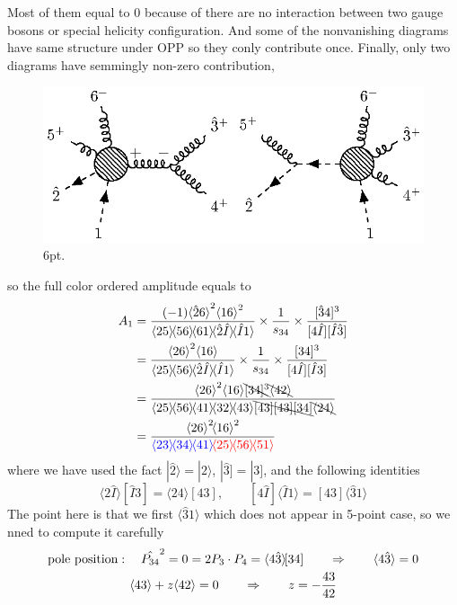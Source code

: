 \documentclass[12pt]{article}
\numberwithin{equation}{section}
\newcommand{\mdavg}[2]{\langle #1 \rangle\!\langle #2 \rangle}
\newcommand{\avg}[1]{\langle #1 \rangle}
\newcommand{\aket}[1]{|#1\rangle}
\newcommand{\asqu}[1]{{\langle#1\rangle}^2}
\newcommand{\sket}[1]{|#1]}
\newcommand{\cbrak}[2]{\avg{#1}\![#2]}
\newcommand{\acbrak}[2]{[#1]\!\avg{#2}}
\begin{document}
Most of them equal to 0 because of there are no interaction between two gauge bosons or special helicity configuration. And some of the nonvanishing diagrams have same structure under OPP so they conly contribute once. Finally, only two diagrams have semmingly non-zero contribution,
\par
\begin{figure}[H]
    \centering
    \includegraphics{6pt.eps}
    \caption{6pt.}
    \label{5}
\end{figure}
so the full color ordered amplitude equals to
\begin{align}
    A_1&=\frac{(-1)\asqu{\hat{2}6}\asqu{16}}{\mdavg{25}{56}\!\avg{61}\!\mdavg{\hat{2}\hat{I}}{\hat{I}1}}\times\frac{1}{s_{34}}\times\frac{[\hat{3}4]^3}{[4\hat{I}][\hat{I}\hat{3}]}\notag\\
    &=\frac{\asqu{26}\avg{16}}{\mdavg{25}{56}\!\mdavg{\hat{2}\hat{I}}{\hat{I}1}}\times\frac{1}{s_{34}}\times\frac{[34]^3}{[4\hat{I}][\hat{I}3]}\notag\\
    &=\frac{\asqu{26}\avg{16}\bcancel{[34]^3}\bcancel{\avg{42}}}{\mdavg{25}{56}\!\mdavg{41}{32}\!\avg{43}\bcancel{[43][43][34]}\bcancel{\avg{24}}}\notag\\
    &=\frac{\asqu{26}\!\asqu{16}}{\textcolor{blue}{\mdavg{23}{34}\!\avg{41}}\!\textcolor{red}{\mdavg{25}{56}\!\avg{51}}}
\end{align}
where we have used the fact $\aket{\hat{2}}=\aket{2}$, $\sket{\hat{3}}=\sket{3}$, and the following identities
\begin{equation}
    \cbrak{2\hat{I}}{\hat{I}3}=\cbrak{24}{43}, \qquad \acbrak{4\hat{I}}{\hat{I}1}=\acbrak{43}{\hat{3}1}
\end{equation}
The point here is that we first $\avg{\hat{3}1}$ which does not appear in 5-point case, so we nned to compute it carefully
\begin{gather}
    \text{pole position}: \quad \hat{P_{34}}^2=0=2P_3\cdot P_4=\cbrak{4\hat{3}}{34}\qquad\Rightarrow \qquad \avg{4\hat{3}}=0\notag\\
    \avg{43}+z\avg{42}=0\qquad \Rightarrow \qquad z=-\frac{43}{42}
\end{gather}
\end{document}
